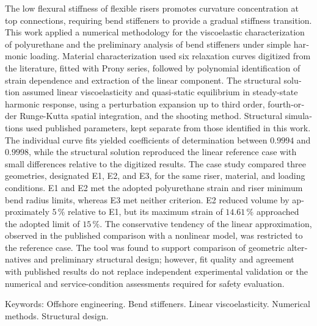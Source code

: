 \documentclass[arial,centeredequations,english,brazilian,oneside,section=TITLE]{ifes8}
\begin{document}
\begin{resumo}[Abstract]
  \begin{otherlanguage}{english}
    The low flexural stiffness of flexible risers promotes curvature concentration
    at top connections, requiring bend stiffeners to provide a gradual stiffness
    transition. This work applied a numerical methodology for the viscoelastic
    characterization of polyurethane and the preliminary analysis of bend stiffeners
    under simple harmonic loading. Material characterization used six relaxation
    curves digitized from the literature, fitted with Prony series, followed by
    polynomial identification of strain dependence and extraction of the linear
    component. The structural solution assumed linear viscoelasticity and
    quasi-static equilibrium in steady-state harmonic response, using a perturbation
    expansion up to third order, fourth-order Runge-Kutta spatial integration, and
    the shooting method. Structural simulations used published parameters,
    kept separate from those identified in this work. The individual curve fits
    yielded coefficients of determination between $0.9994$ and $0.9998$, while the
    structural solution reproduced the linear reference case with small differences
    relative to the digitized results. The case study compared three geometries,
    designated E1, E2, and E3, for the same riser, material, and loading conditions.
    E1 and E2 met the adopted polyurethane strain and riser minimum bend radius
    limits, whereas E3 met neither criterion. E2 reduced volume by approximately
    $5\,\%$ relative to E1, but its maximum strain of $14.61\,\%$ approached the
    adopted limit of $15\,\%$. The conservative tendency of the linear approximation,
    observed in the published comparison with a nonlinear model, was restricted
    to the reference case. The tool was found to support comparison of geometric
    alternatives and preliminary structural design; however, fit quality and
    agreement with published results do not replace independent experimental
    validation or the numerical and service-condition assessments required for
    safety evaluation.

    Keywords: Offshore engineering. Bend stiffeners. Linear viscoelasticity. Numerical methods. Structural design.
  \end{otherlanguage}
\end{resumo}


\end{document}
